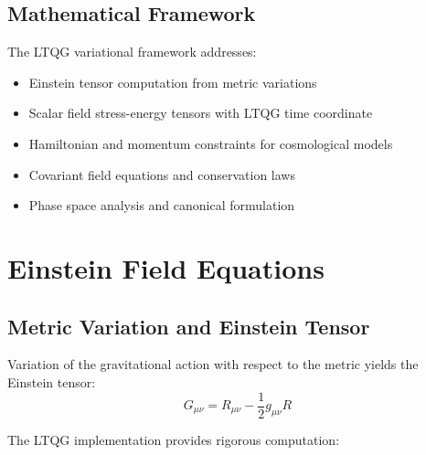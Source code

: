\documentclass[11pt,a4paper]{article}
\theoremstyle{definition}
\theoremstyle{remark}
\begin{document}
\subsection{Mathematical Framework}

The LTQG variational framework addresses:
\begin{itemize}
\item Einstein tensor computation from metric variations
\item Scalar field stress-energy tensors with LTQG time coordinate
\item Hamiltonian and momentum constraints for cosmological models
\item Covariant field equations and conservation laws
\item Phase space analysis and canonical formulation
\end{itemize}

\section{Einstein Field Equations}

\subsection{Metric Variation and Einstein Tensor}

Variation of the gravitational action with respect to the metric yields the Einstein tensor:
\begin{equation}
G_{\mu\nu} = R_{\mu\nu} - \frac{1}{2} g_{\mu\nu} R
\end{equation}

The LTQG implementation provides rigorous computation:
\end{document}
